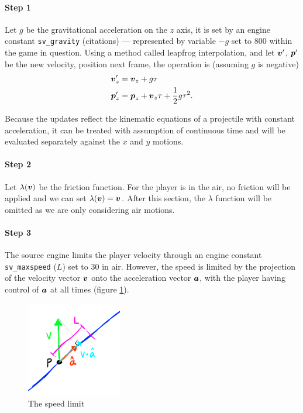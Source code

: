 \paragraph{Step 1} Let $g$ be the gravitational acceleration on the $z$ axis, it is set by an engine constant \verb|sv_gravity| (citations) --- represented by variable $-g$ set to $800$ within the game in question. Using a method called leapfrog interpolation, and let $\boldsymbol{v}'$, $\boldsymbol{p}'$ be the new velocity, position next frame, the operation is (assuming $g$ is negative)
\begin{align}
    \boldsymbol{v}'_z &= \boldsymbol{v}_z + g\tau \label{eq:gv}\\
    \boldsymbol{p}'_z &= \boldsymbol{p}_z + \boldsymbol{v}_z\tau + \frac{1}{2}g\tau^2 \label{eq:gp}.
\end{align}

Because the updates reflect the kinematic equations of a projectile with constant acceleration, it can be treated with assumption of continuous time and will be evaluated separately against the $x$ and $y$ motions.


\paragraph{Step 2} Let $\lambda(\boldsymbol{v})$ be the friction function. For the player is in the air, no friction will be applied and we can set $\lambda(\boldsymbol{v}) = \boldsymbol{v}$. After this section, the $\lambda$ function will be omitted as we are only considering air motions.

\paragraph{Step 3} The source engine limits the player velocity through an engine constant \verb|sv_maxspeed| ($L$) set to $30$ in air. However, the speed is limited by the projection of the velocity vector $\boldsymbol{v}$ onto the acceleration vector $\boldsymbol{a}$, with the player having control of $\boldsymbol{a}$ at all times (figure \ref{fig:speedlimit}).

\begin{figure}
    \includegraphics[width=0.37\textwidth,right]{assets/speedlimit.png}
    \caption{The speed limit}
    \label{fig:speedlimit}
\end{figure}

